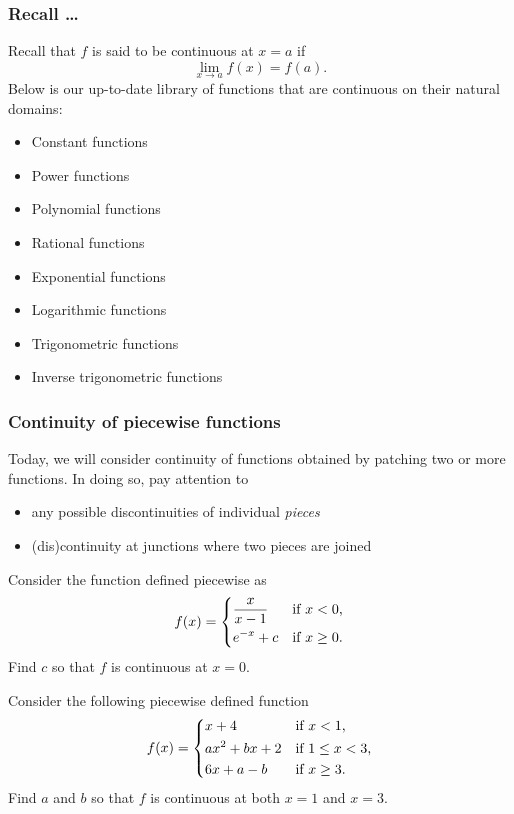 \documentclass[10pt,t,presentation,ignorenonframetext,aspectratio=169]{beamer}
\title[\course]{\lecTitle}
\institute[Ohio State]
{
  \medskip
}
\date[\week]{\semester}
\author{Tae Eun Kim, Ph.D.}
\begin{document}
\begin{frame}
  \titlepage
\end{frame}

\begin{frame}
  \frametitle{Recall \ldots}
  Recall that $f$ is said to be continuous at $x =
  a$ if
  \[
    \lim_{x \to a} f(x) = f(a) .
  \]
  \vfill
  Below is our up-to-date library of functions that are continuous on their natural
  domains:
  \begin{itemize}
  \item Constant functions
  \item Power functions
  \item Polynomial functions
  \item Rational functions
  \item Exponential functions
  \item Logarithmic functions
  \item Trigonometric functions
  \item Inverse trigonometric functions
  \end{itemize}
  \vfill
\end{frame}

\begin{frame}
  \frametitle{Continuity of piecewise functions}
  Today, we will consider continuity of functions obtained by patching
  two or more functions. In doing so, pay attention to
  \begin{itemize}
  \item any possible discontinuities of individual \textit{pieces}
  \item (dis)continuity at junctions where two pieces are joined
  \end{itemize}
\end{frame}

\begin{frame}
  \vs
  \begin{question}
    Consider the function defined piecewise as
    \[
      f(x) =
      \begin{dcases}
        \frac{x}{x-1} &\text{if $x<0$,}\\
        e^{-x} + c &\text{if $x\ge 0$}.
      \end{dcases}
    \]
    Find $c$ so that $f$ is continuous at $x = 0$.
  \end{question}
\end{frame}

\begin{frame}
  \vs
  \begin{question}
    Consider the following piecewise defined function
    \[
      f(x) =
      \begin{dcases}
        x+4 &\text{if $x<1$,}\\
        ax^2+bx+2 &\text{if $1\le x< 3$,}\\
        6x+a-b &\text{if $x\ge 3$.}
      \end{dcases}
    \]
    Find $a$ and $b$ so that $f$ is continuous at both $x=1$ and $x=3$.
  \end{question}
\end{frame}
\end{document}

